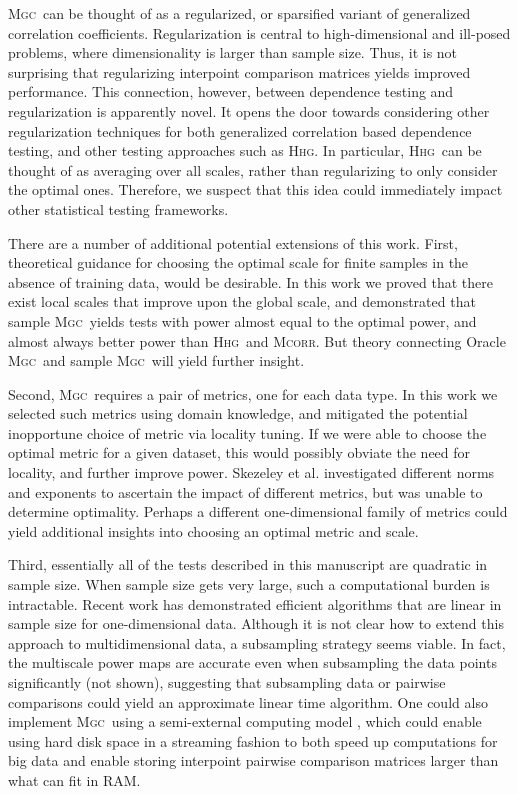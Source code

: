 \documentclass[11pt]{article}
\providecommand{\sct}[1]{{\normalfont\textsc{#1}}}
\newcommand{\Mgc}{\sct{Mgc}}
\newcommand{\Hhg}{\sct{Hhg}}
\newcommand{\Mcorr}{\sct{Mcorr}}
\begin{document}
 \Mgc~can be thought of as a regularized, or sparsified variant of generalized correlation coefficients.  Regularization is central to high-dimensional and ill-posed problems, where dimensionality is larger than sample size.  Thus, it is not surprising that regularizing interpoint comparison matrices yields improved performance.  This connection, however, between dependence testing and regularization is apparently novel.  It opens the door towards considering other regularization techniques for both generalized correlation based dependence testing, and other testing approaches such as \Hhg. In particular, \Hhg~can be thought of as averaging over all scales, rather than regularizing to only consider the optimal ones.  Therefore, we suspect that this idea could immediately impact other statistical testing frameworks.



There are a number of additional potential extensions of this work.  First, theoretical guidance for choosing the optimal scale for finite samples  in the absence of training data, would be desirable. 
In this work we proved that there exist local scales that improve upon the global scale, and demonstrated that sample \Mgc~yields tests with power almost equal to the optimal power, and almost always better power than \Hhg~and \Mcorr.  But  theory connecting Oracle \Mgc~and  sample \Mgc~will yield further insight.


Second, \Mgc~requires a pair of metrics, one for each data type. In this work we selected such metrics using domain knowledge, and mitigated the potential inopportune choice of metric via locality tuning.  If we were able to choose the optimal metric for a given dataset, this would possibly obviate the need for locality, and further improve power. Skezeley et al. investigated different norms and exponents to ascertain the impact of different metrics, but was unable to determine optimality.
Perhaps a different one-dimensional family of metrics could yield additional insights into choosing an optimal metric and scale.

Third, essentially all of the tests described in this manuscript are quadratic in sample size.  When sample size gets very large, such a computational burden is intractable.  Recent work has demonstrated efficient algorithms that are linear in sample size \cite{Huo2016} for one-dimensional data.  Although it is not clear how to extend this approach to multidimensional data, a subsampling strategy seems viable.  In fact, the multiscale power maps are accurate even when subsampling the data points significantly (not shown), suggesting that subsampling data or pairwise comparisons  could yield an approximate linear time algorithm.  One could also implement \Mgc~using a semi-external computing model \cite{Zheng2016},  which could enable using hard disk space in a streaming fashion to both speed up computations for big data and enable storing interpoint pairwise comparison matrices larger than what can fit in RAM.
\end{document}
